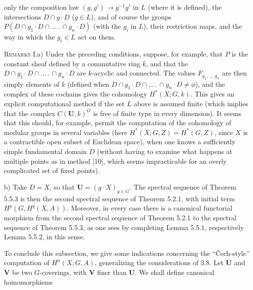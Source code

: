 \clearpage
{}

\noindent only the composition law $(g,g')\to g^{-1}g'$ in $L$ (where it
is defined), the intersections $D\cap g\cdot D$ ($g\in L$), and of course the
groups $P(D\cap g_1\cdot D\cap\ldots\,.\,\cap g_n\cdot D)$ (with the $g_i$ in
$L$), their restriction maps, and the way in which the $g_i\in L$ act on them.

\textsc{Remarks I.}\quad a) Under the preceding conditions, suppose,
for example, that $P$ is the constant sheaf defined by a commutative ring $k$,
and that the $D\cap g_1\cdot D\cap\ldots\,.\,\cap g_n\cdot D$ are $k$-acyclic and
connected. The values $F_{g_1,\ldots,g_n}$ are then simply elements of $k$
(defined when $D\cap g_1\cdot D\cap\ldots\,.\,\cap g_n\cdot D\ne\phi$), and the
complex of these cochains gives the cohomology $H^*(X;G,k)$. This gives an
explicit computational method if the set $L$ above is assumed finite (which
implies that the complex $C({\mathbf U},k)^G$ is free of finite type in every
dimension). It seems that this should, for example, permit the computation of the
cohomology of modular groups in several variables (here
$H^*(X;G,Z)=H^*(G,Z)$, since $X$ is a contractible open subset
of Euclidean space), when one knows a sufficiently simple fundamental domain
$D$ (without having to examine what happens at multiple points as in method
[10], which seems impracticable for an overly complicated set of fixed
points).

b) Take $D=X$, so that ${\mathbf U}=(g\cdot X)_{g\in G}$. The spectral sequence
of Theorem 5.5.3 is then the second spectral sequence of Theorem 5.2.1, with
initial term $H^p(G,H^q(X,A))$. Moreover, in every case there is a canonical
functorial morphism from the second spectral sequence of Theorem 5.2.1 to the
spectral sequence of Theorem 5.5.3, as one sees by completing Lemma 5.5.1,
respectively Lemma 5.5.2, in this sense.

To conclude this subsection, we give some indications concerning the
``Čech-style'' computation of $H^n(X;G,A)$, generalizing the considerations of
3.8. Let ${\mathbf U}$ and ${\mathbf V}$ be two $G$-coverings, with
${\mathbf V}$ finer than ${\mathbf U}$. We shall define canonical homomorphisms

